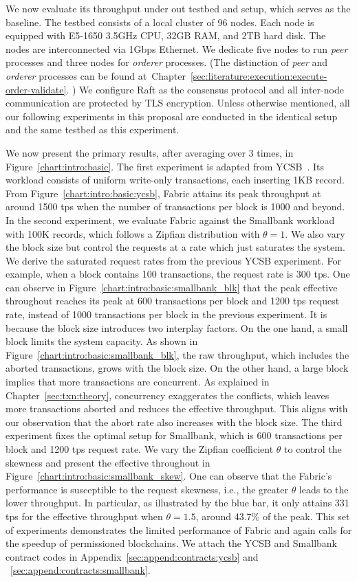 We now evaluate its throughput under out testbed and setup, which serves as the baseline. 
The testbed consists of a local cluster of 96 nodes. Each node is equipped with E5-1650 3.5GHz CPU, 32GB RAM, and 2TB hard disk. The nodes are interconnected via 1Gbps Ethernet. 
We dedicate five nodes to run \textit{peer} processes and three nodes for \textit{orderer} processes. 
(The distinction of \textit{peer} and \textit{orderer} processes can be found at~Chapter~\ref{sec:literature:execution:execute-order-validate}.  )
We configure Raft as the consensus protocol and all inter-node communication are protected by TLS encryption. 
Unless otherwise mentioned, all our following experiments in this proposal are conducted in the identical setup and the same testbed as this experiment.

We now present the primary results, after averaging over 3 times, in Figure~\ref{chart:intro:basic}. 
The first experiment is adapted from YCSB~\cite{cooper2010benchmarking}. 
Its workload consists of uniform write-only transactions, each inserting 1KB record. 
From Figure~\ref{chart:intro:basic:ycsb}, Fabric attains its peak throughput at around 1500 tps when the number of transactions per block is 1000 and beyond. 
In the second experiment, we evaluate Fabric against the Smallbank workload with 100K records, which follows a Zipfian distribution with $\theta=1$. 
We also vary the block size but control the requests at a rate which just saturates the system. 
We derive the saturated request rates from the previous YCSB experiment. 
For example, when a block contains 100 transactions, the request rate is 300 tps.
One can observe in Figure~\ref{chart:intro:basic:smallbank_blk} that the peak effective throughout reaches its peak at 600 transactions per block and 1200 tps request rate, instead of 1000 transactions per block in the previous experiment. 
It is because the block size introduces two interplay factors. 
On the one hand, a small block limits the system capacity.
As shown in Figure~\ref{chart:intro:basic:smallbank_blk}, the raw throughput, which includes the aborted transactions, grows with the block size. 
On the other hand, a large block implies that more transactions are concurrent. 
As explained in Chapter~\ref{sec:txn:theory}, concurrency exaggerates the conflicts, which leaves more transactions aborted and reduces the effective throughput. 
This aligns with our observation that the abort rate also increases with the block size.
The third experiment fixes the optimal setup for Smallbank, which is 600 transactions per block and 1200 tps request rate. 
We vary the Zipfian coefficient $\theta$ to control the skewness and present the effective throughout in Figure~\ref{chart:intro:basic:smallbank_skew}. 
One can observe that the Fabric's performance is susceptible to the request skewness, i.e., the greater $\theta$ leads to the lower throughput. 
In particular, as illustrated by the blue bar, it only attains 331 tps for the effective throughput when $\theta=1.5$, around 43.7\% of the peak. 
This set of experiments demonstrates the limited performance of Fabric and again calls for the speedup of permissioned blockchains. 
We attach the YCSB and Smallbank contract codes in Appendix~\ref{sec:append:contracts:ycsb} and ~\ref{sec:append:contracts:smallbank}. 

